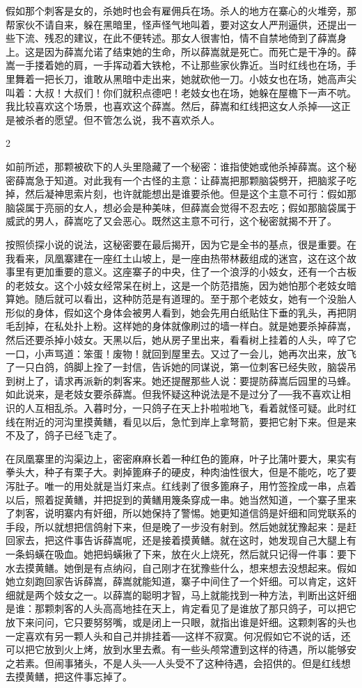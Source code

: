 假如那个刺客是女的，杀她时也会有雇佣兵在场。杀人的地方在寨心的火堆旁，那帮家伙不请自来，躲在黑暗里，怪声怪气地叫着，要对这女人严刑逼供，还提出一些下流、残忍的建议，在此不便转述。那女人很害怕，情不自禁地倚到了薛嵩身上。这是因为薛嵩允诺了结束她的生命，所以薛嵩就是死亡。而死亡是干净的。薛嵩一手搂着她的肩，一手挥动着大铁枪，不让那些家伙靠近。当时红线也在场，手里舞着一把长刀，谁敢从黑暗中走出来，她就砍他一刀。小妓女也在场，她高声尖叫着：大叔！大叔们！你们就积点德吧！老妓女也在场，她躲在屋檐下一声不吭。我比较喜欢这个场景，也喜欢这个薛嵩。然后，薛嵩和红线把这女人杀掉──这正是被杀者的愿望。但不管怎么说，我不喜欢杀人。 

2 

如前所述，那颗被砍下的人头里隐藏了一个秘密：谁指使她或他杀掉薛嵩。这个秘密薛嵩急于知道。对此我有一个古怪的主意：让薛嵩把那颗脑袋劈开，把脑浆子吃掉，然后凝神思索片刻，也许就能想出是谁要杀他。但是这个主意不可行：假如那脑袋属于亮丽的女人，想必会是种美味，但薛嵩会觉得不忍去吃；假如那脑袋属于威武的男人，薛嵩吃了又会恶心。既然这主意不可行，这个秘密就揭不开了。 

按照侦探小说的说法，这秘密要在最后揭开，因为它是全书的基点，很是重要。在我看来，凤凰寨建在一座红土山坡上，是一座由热带林薮组成的迷宫，这在这个故事里有更加重要的意义。这座寨子的中央，住了一个浪浮的小妓女，还有一个古板的老妓女。这个小妓女经常呆在树上，这是一个防范措施，因为她怕那个老妓女暗算她。随后就可以看出，这种防范是有道理的。至于那个老妓女，她有一个没胎人形似的身体，假如这个身体会被男人看到，她会先用白纸贴住下垂的乳头，再把阴毛刮掉，在私处扑上粉。这样她的身体就像刷过的墙一样白。就是她要杀掉薛嵩，然后还要杀掉小妓女。天黑以后，她从房子里出来，看看树上挂着的人头，啐了它一口，小声骂道：笨蛋！废物！就回到屋里去。又过了一会儿，她再次出来，放飞了一只白鸽，鸽脚上拴了一封信，告诉她的同谋说，第一位刺客已经失败，脑袋吊到树上了，请求再派新的刺客来。她还提醒那些人说：要提防薛嵩后园里的马蜂。如此说来，是老妓女要杀薛嵩。但我怀疑这种说法是不是过分了──我不喜欢让相识的人互相乱杀。入暮时分，一只鸽子在天上扑啦啦地飞，看着就怪可疑。此时红线在附近的河沟里摸黄鳝，看见以后，急忙到岸上拿弩箭，要把它射下来。但是来不及了，鸽子已经飞走了。 

在凤凰寨里的沟渠边上，密密麻麻长着一种红色的篦麻，叶子比蒲叶要大，果实有拳头大，种子有栗子大。剥掉篦麻子的硬皮，种肉油性很大，但是不能吃，吃了要泻肚子。唯一的用处就是当灯来点。红线剥了很多篦麻子，用竹签拴成一串，点着以后，照着捉黄鳝，并把捉到的黄鳝用篾条穿成一串。她当然知道，一个寨子里来了刺客，说明寨内有奸细，所以她保持了警惕。她更知道信鸽是奸细和同党联系的手段，所以就想把信鸽射下来，但是晚了一步没有射到。然后她就犹豫起来：是赶回家去，把这件事告诉薛嵩呢，还是接着摸黄鳝。就在这时，她发现自己大腿上有一条蚂蟥在吸血。她把蚂蟥揪了下来，放在火上烧死，然后就只记得一件事：要下水去摸黄鳝。她倒是有点纳闷，自己刚才在犹豫些什么，想来想去没想起来。假如她立刻跑回家告诉薛嵩，薛嵩就能知道，寨子中间住了一个奸细。可以肯定，这奸细就是两个妓女之一。以薛嵩的聪明才智，马上就能找到一种方法，判断出这奸细是谁：那颗刺客的人头高高地挂在天上，肯定看见了是谁放了那只鸽子，可以把它放下来问问，它只要努努嘴，或是闭上一只眼，就指出谁是奸细。这颗刺客的头也一定喜欢有另一颗人头和自己并排挂着──这样不寂寞。何况假如它不说的话，还可以把它放到火上烤，放到水里去煮。有一些头颅常遭到这样的待遇，所以能够安之若素。但闹事猪头，不是人头──人头受不了这种待遇，会招供的。但是红线想去摸黄鳝，把这件事忘掉了。 

